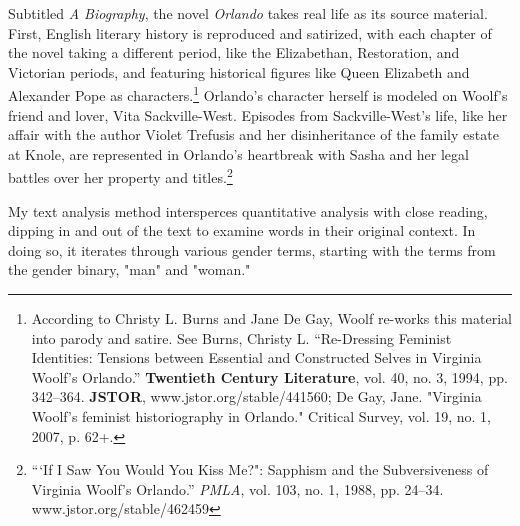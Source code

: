 \documentclass[11pt]{article}
\begin{document}
Subtitled \emph{A Biography}, the novel \emph{Orlando} takes real life as its
source material. First, English literary history is reproduced and
satirized, with each chapter of the novel taking a different period,
like the Elizabethan, Restoration, and Victorian periods, and
featuring historical figures like Queen Elizabeth and Alexander Pope
as characters.\footnote{According to Christy L. Burns and Jane De Gay, Woolf re-works
this material into parody and satire. See Burns, Christy L. “Re-Dressing
Feminist Identities: Tensions between Essential and Constructed Selves
in Virginia Woolf's Orlando.” \textbf{Twentieth Century Literature}, vol. 40,
no. 3, 1994, pp. 342–364. \textbf{JSTOR}, www.jstor.org/stable/441560; De
Gay, Jane. "Virginia Woolf's feminist historiography in Orlando."
Critical Survey, vol. 19, no. 1, 2007, p. 62+.} Orlando's character herself is modeled on Woolf's
friend and lover, Vita Sackville-West. Episodes from Sackville-West's
life, like her affair with the author Violet Trefusis and her
disinheritance of the family estate at Knole, are represented in
Orlando's heartbreak with Sasha and her legal battles over her
property and titles.\footnote{“‘If I Saw You Would You Kiss Me?": Sapphism and the
Subversiveness of Virginia Woolf's Orlando.” \emph{PMLA}, vol. 103, no. 1,
1988, pp. 24–34. www.jstor.org/stable/462459}

My text analysis method intersperces quantitative analysis with close
reading, dipping in and out of the text to examine words in their
original context. In doing so, it iterates through various gender
terms, starting with the terms from the gender binary, "man" and
"woman."
\end{document}

